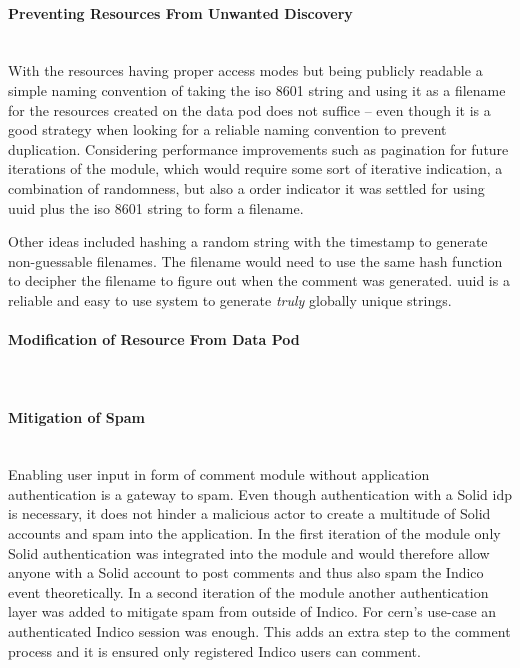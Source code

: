 \paragraph{Preventing Resources From Unwanted Discovery}\mbox{}\\

With the resources having proper access modes but being publicly readable a simple naming convention of taking the \gls{iso} 8601 string and using it as a filename for the resources created on the data pod does not suffice -- even though it is a good strategy when looking for a reliable naming convention to prevent duplication. Considering performance improvements such as pagination for future iterations of the module, which would require some sort of iterative indication, a combination of randomness, but also a order indicator it was settled for using \gls{uuid} plus the \gls{iso} 8601 string to form a filename.

Other ideas included hashing a random string with the timestamp to generate non-guessable filenames. The filename would need to use the same hash function to decipher the filename to figure out when the comment was generated. \gls{uuid} is a reliable and easy to use system to generate \textit{truly} globally unique strings. 

\paragraph{Modification of Resource From Data Pod}\mbox{}\\

\paragraph{Mitigation of Spam}\mbox{}\\

Enabling user input in form of comment module without application authentication is a gateway to spam. Even though authentication with a Solid \gls{idp} is necessary, it does not hinder a malicious actor to create a multitude of Solid accounts and spam into the application. In the first iteration of the module only Solid authentication was integrated into the module and would therefore allow anyone with a Solid account to post comments and thus also spam the Indico event theoretically. In a second iteration of the module another authentication layer was added to mitigate spam from outside of Indico. For \gls{cern}’s use-case an authenticated Indico session was enough. This adds an extra step to the comment process and it is ensured only registered Indico users can comment.

